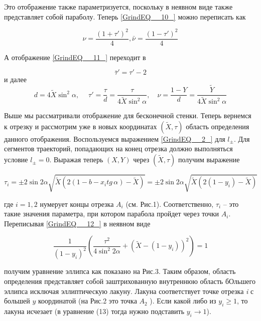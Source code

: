\documentclass[a4paper]{article}
\begin{document}
Это отображение также параметризуется, поскольку в неявном виде также представляет собой параболу. Теперь \eqref{GrindEQ__10_} можно переписать как

\begin{equation} \label{GrindEQ__11_2_2_}\nu =\frac{\left(1+\tau '\right)^{2} }{4} ,\bar{\nu }=\frac{\left(1-\tau '\right)^{2} }{4} \end{equation}

А отображение \eqref{GrindEQ__11_} переходит в

\begin{equation} \label{GrindEQ__11_2_3_}\bar{\tau }'=\tau '-2 \end{equation}
и далее
\begin{equation} \label{GrindEQ__11_2_4_} d=4\tilde{X}\sin ^{2} \alpha ,\; \quad \tau '=\frac{\tau }{d} =\frac{\tau }{4\tilde{X}\sin ^{2} \alpha } ,\quad \nu =\frac{1-Y}{d} =\frac{\tilde{Y}}{4\tilde{X}\sin ^{2} \alpha } \end{equation}

 Выше мы рассматривали отображение для бесконечной стенки. Теперь вернемся к отрезку и рассмотрим уже в новых координатах $\left(\tilde{X},\tau \right)$ область определения данного отображения. Воспользуемся выражением \eqref{GrindEQ__2_} для $l_{\pm } $. Для сегментов траекторий, попадающих на конец отрезка должно выполняться условие $l_{\pm } =0$. Выражая теперь $\left(X,Y\right)$ через $\left(\tilde{X},\tau \right)$ получим выражение

\begin{equation} \label{GrindEQ__12_} \tau _{i} =\pm 2\sin 2\alpha \sqrt{\tilde{X}\left(2\left(1-b-x_{i} tg\, \alpha \right)-\tilde{X}\right)} =\pm 2\sin 2\alpha \sqrt{\tilde{X}\left(2\left(1-y_{i} \right)-\tilde{X}\right)}  \end{equation}

где $i=1,2$ нумерует концы отрезка $A_{i} $ (см. Рис.1). Соответственно, $\tau _{i} $ -- это такие значения параметра, при котором парабола пройдет через точки $A_{i} $. Переписывая \eqref{GrindEQ__12_} в неявном виде

\begin{equation} \label{GrindEQ__13_} \frac{1}{\left(1-y_{i} \right)^{2} } \left(\frac{\tau ^{2} }{4\sin ^{2} 2\alpha } +\left(\tilde{X}-\left(1-y_{i} \right)\right)^{2} \right)=1 \end{equation}

получим уравнение эллипса как показано на Рис.3. Таким образом, область определения представляет собой заштрихованную внутреннюю область бОльшего эллипса исключая эллиптическую лакуну. Лакуна соответствует точке отрезка \textit{i} с большей $y$ координатой (на Рис.2 это точка $A_{2} $ ). Если какой либо из $y_{i} \ge 1$, то лакуна исчезает (в уравнение (13) тогда нужно подставить $y_{i} \to 1$).
\end{document}
